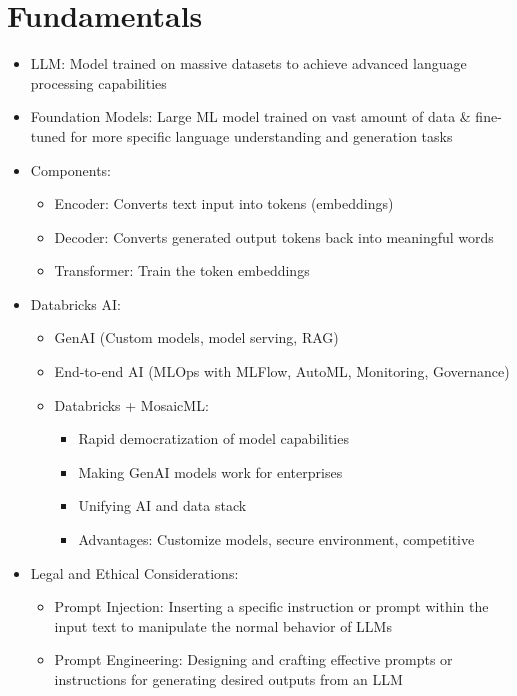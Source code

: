 \documentclass[11pt]{scrartcl}
\begin{document}
\tableofcontents

\newpage
\section{Fundamentals}
\begin{itemize}
	\item LLM: Model trained on massive datasets to achieve advanced language processing capabilities
	\item Foundation Models: Large ML model trained on vast amount of data \& fine-tuned for more specific language understanding and generation tasks 
	\item Components: 
	\begin{itemize}
		\item Encoder: Converts text input into tokens (embeddings)
		\item Decoder: Converts generated output tokens back into meaningful words
		\item Transformer: Train the token embeddings
	\end{itemize}
	\item Databricks AI:
	\begin{itemize}
		\item GenAI (Custom models, model serving, RAG)
		\item End-to-end AI (MLOps with MLFlow, AutoML, Monitoring, Governance)
		\item Databricks + MosaicML:
		\begin{itemize}
			\item Rapid democratization of model capabilities
			\item Making GenAI models work for enterprises
			\item Unifying AI and data stack
			\item Advantages: Customize models, secure environment, competitive
		\end{itemize}
	\end{itemize}
	\item Legal and Ethical Considerations:
	\begin{itemize}
		\item Prompt Injection: Inserting a specific instruction or prompt within the input text to manipulate the normal behavior of LLMs
		\item Prompt Engineering: Designing and crafting effective prompts or instructions for generating desired outputs from an LLM
	\end{itemize}
\end{itemize}
\end{document}
